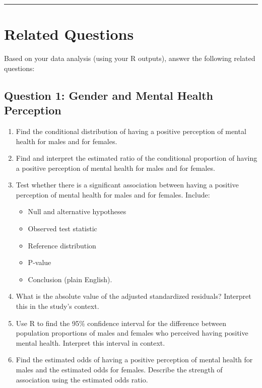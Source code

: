 \documentclass[oneside,openany]{book}
\providecommand{\tightlist}{%
  \setlength{\itemsep}{0pt}\setlength{\parskip}{0pt}}
\begin{document}
\begin{center}\rule{0.5\linewidth}{0.5pt}\end{center}

\section{Related Questions}\label{related-questions-8}

Based on your data analysis (using your R outputs), answer the following related questions:

\subsection{Question 1: Gender and Mental Health Perception}\label{question-1-gender-and-mental-health-perception}

\begin{enumerate}
\def\labelenumi{\arabic{enumi}.}
\tightlist
\item
  Find the conditional distribution of having a positive perception of mental health for males and for females.
\item
  Find and interpret the estimated ratio of the conditional proportion of having a positive perception of mental health for males and for females.
\item
  Test whether there is a significant association between having a positive perception of mental health for males and for females. Include:

  \begin{itemize}
  \tightlist
  \item
    Null and alternative hypotheses
  \item
    Observed test statistic
  \item
    Reference distribution
  \item
    P-value
  \item
    Conclusion (plain English).
  \end{itemize}
\item
  What is the absolute value of the adjusted standardized residuals? Interpret this in the study's context.
\item
  Use R to find the 95\% confidence interval for the difference between population proportions of males and females who perceived having positive mental health. Interpret this interval in context.
\item
  Find the estimated odds of having a positive perception of mental health for males and the estimated odds for females. Describe the strength of association using the estimated odds ratio.
\end{enumerate}
\end{document}

